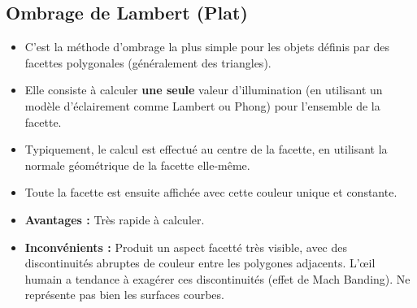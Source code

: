 \subsection{Ombrage de Lambert (Plat)}
\begin{itemize}
    \item C'est la méthode d'ombrage la plus simple pour les objets définis par des facettes polygonales (généralement des triangles).
    \item Elle consiste à calculer \textbf{une seule} valeur d'illumination (en utilisant un modèle d'éclairement comme Lambert ou Phong) pour l'ensemble de la facette.
    \item Typiquement, le calcul est effectué au centre de la facette, en utilisant la normale géométrique de la facette elle-même.
    \item Toute la facette est ensuite affichée avec cette couleur unique et constante.
    \item \textbf{Avantages :} Très rapide à calculer.
    \item \textbf{Inconvénients :} Produit un aspect facetté très visible, avec des discontinuités abruptes de couleur entre les polygones adjacents. L'œil humain a tendance à exagérer ces discontinuités (effet de Mach Banding). Ne représente pas bien les surfaces courbes.
\end{itemize}
